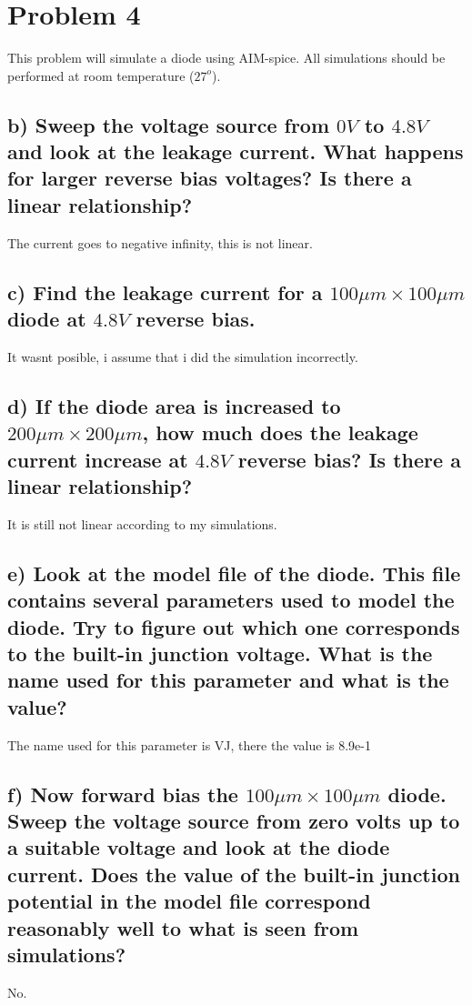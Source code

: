 \section{Problem 4}
This problem will simulate a diode using AIM-spice. All simulations should be performed
at room temperature ($27^o$).

\subsection*{b) Sweep the voltage source from $0 V$ to $4.8 V$ and look at the leakage current. What happens for larger reverse bias voltages? Is there a linear relationship?}


The current goes to negative infinity, this is not linear.

\subsection*{c) Find the leakage current for a $100 \mu m \times 100 \mu m$ diode at $4.8 V$ reverse bias.}

It wasnt posible, i assume that i did the simulation incorrectly.

\subsection*{d) If the diode area is increased to $200 \mu m \times 200 \mu m$, how much does the leakage current increase at $4.8 V$ reverse bias? Is there a linear relationship?}

It is still not linear according to my simulations.

\subsection*{e) Look at the model file of the diode. This file contains several parameters used to
model the diode. Try to figure out which one corresponds to the built-in junction
voltage. What is the name used for this parameter and what is the value?}

The name used for this parameter is VJ, there the value is 8.9e-1

\subsection*{f) Now forward bias the $100 \mu m \times 100 \mu m$ diode. Sweep the voltage source from zero volts up to a suitable voltage and look at the diode current. Does the value of the built-in junction potential in the model file correspond reasonably well to what is seen from simulations?}

No.